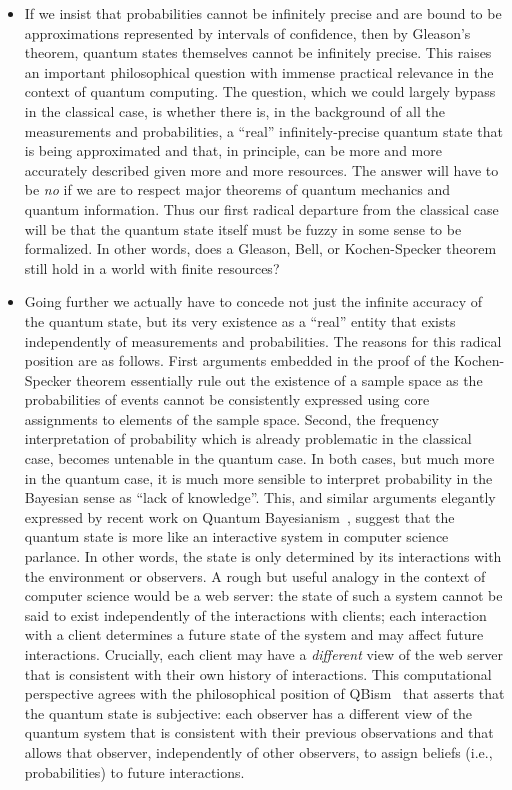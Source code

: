 \documentclass{article}
\theoremstyle{remark}
\begin{document}
\begin{itemize}

\item If we insist that probabilities cannot be infinitely precise and
  are bound to be approximations represented by intervals of
  confidence, then by Gleason's theorem, quantum states themselves
  cannot be infinitely precise. This raises an important philosophical
  question with immense practical relevance in the context of quantum
  computing. The question, which we could largely bypass in the
  classical case, is whether there is, in the background of all the
  measurements and probabilities, a ``real'' infinitely-precise
  quantum state that is being approximated and that, in principle, can
  be more and more accurately described given more and more
  resources. The answer will have to be \emph{no} if we are to respect
  major theorems of quantum mechanics and quantum information. Thus
  our first radical departure from the classical case will be that the
  quantum state itself must be fuzzy in some sense to be
  formalized. In other words, does a Gleason, Bell, or Kochen-Specker
  theorem still hold in a world with finite resources? 

\item Going further we actually have to concede not just the infinite
  accuracy of the quantum state, but its very existence as a ``real''
  entity that exists independently of measurements and
  probabilities. The reasons for this radical position are as
  follows. First arguments embedded in the proof of the Kochen-Specker
  theorem essentially rule out the existence of a sample space as the
  probabilities of events cannot be consistently expressed using core
  assignments to elements of the sample space. Second, the frequency
  interpretation of probability which is already problematic in the
  classical case, becomes untenable in the quantum case. In both
  cases, but much more in the quantum case, it is much more sensible
  to interpret probability in the Bayesian sense as ``lack of
  knowledge''. This, and similar arguments elegantly expressed by
  recent work on Quantum Bayesianism~\cite{Fuchs2010,VonBaeyer2016},
  suggest that the quantum state is more like an interactive system in
  computer science parlance. In other words, the state is only
  determined by its interactions with the environment or observers. A
  rough but useful analogy in the context of computer science would be
  a web server: the state of such a system cannot be said to exist
  independently of the interactions with clients; each interaction
  with a client determines a future state of the system and may affect
  future interactions. Crucially, each client may have a
  \emph{different} view of the web server that is consistent with
  their own history of interactions. This computational perspective
  agrees with the philosophical position of QBism~\cite{VonBaeyer2016}
  that asserts that the quantum state is subjective: each observer has
  a different view of the quantum system that is consistent with their
  previous observations and that allows that observer, independently
  of other observers, to assign beliefs (i.e., probabilities) to
  future interactions.

\end{itemize} 
\end{document}
